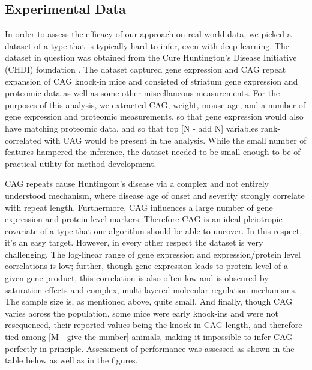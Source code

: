 \documentclass{article}
\begin{document}
\subsection{Experimental Data}
In order to assess the efficacy of our approach on real-world data, we picked a dataset of a type that is typically hard to infer, even with deep learning.  The dataset in question was obtained from the Cure Huntington's Disease Initiative (CHDI) foundation \cite{langfelder_integrated_2016}.  The dataset captured gene expression and CAG repeat expansion of CAG knock-in mice and consisted of striatum gene expression and proteomic data as well as some other miscellaneous measurements.  For the purposes of this analysis, we extracted CAG, weight, mouse age, and a number of gene expression and proteomic measurements, so that gene expression would also have matching proteomic data, and so that top [N - add N] variables rank-correlated with CAG would be present in the analysis.  While the small number of features hampered the inference, the dataset needed to be small enough to be of practical utility for method development.

CAG repeats cause Huntingont's disease via a complex and not entirely understood mechanism, where disease age of onset and severity strongly correlate with repeat length.  Furthermore, CAG influences a large number of gene expression and protein level markers.  Therefore CAG is an ideal pleiotropic covariate of a type that our algorithm should be able to uncover.  In this respect, it's an easy target.  However, in every other respect the dataset is very challenging.  The log-linear range of gene expression and expression/protein level correlations is low; further, though gene expression leads to protein level of a given gene product, this correlation is also often low and is obscured by saturation effects and complex, multi-layered molecular regulation mechanisms.  The sample size is, as mentioned above, quite small.  And finally, though CAG varies across the population, some mice were early knock-ins and were not resequenced, their reported values being the knock-in CAG length, and therefore tied among [M - give the number] animals, making it impossible to infer CAG perfectly in principle.  Assessment of performance was assessed as shown in the table below as well as in the figures.
\end{document}
